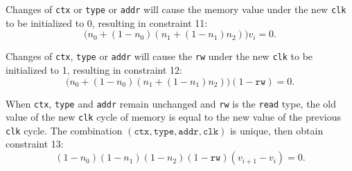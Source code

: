 Changes of \verb|ctx| or \verb|type| or \verb|addr| will cause the memory value under the new \verb|clk| to be initialized to 0, resulting in constraint 11:
\begin{equation*}
    \big( n_0+(1-n_0)(n_1+(1-n_1)n_2) \big) v_i = 0.
\end{equation*}

Changes of \verb|ctx|, \verb|type| or \verb|addr| will cause the \verb|rw| under the new \verb|clk| to be initialized to 1, resulting in constraint 12:
\begin{equation*}
    \big( n_0+(1-n_0)(n_1+(1-n_1)n_2) \big) (1-\texttt{rw}) = 0.
\end{equation*}

When \verb|ctx|, \verb|type| and \verb|addr| remain unchanged and \verb|rw| is the \verb|read| type, the old value of the new \verb|clk| cycle of memory is equal to the new value of the previous \verb|clk| cycle. The combination $(\texttt{ctx},\texttt{type},\texttt{addr},\texttt{clk})$ is unique, then obtain constraint 13:
\begin{equation*}
    (1-n_0)(1-n_1)(1-n_2) (1-\texttt{rw}) (v_{i+1}-v_i) = 0.
\end{equation*}
